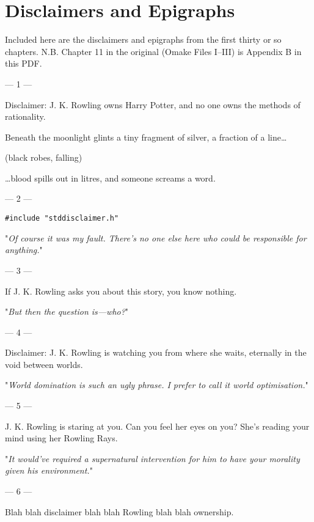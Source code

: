 \chapter{Disclaimers and Epigraphs}

Included here are the disclaimers and epigraphs from the first thirty or so chapters. N.B. Chapter 11 in the original (Omake Files I–III) is Appendix B in this PDF.

{%
\setlength{\parindent}{0pt}
\setlength{\parskip}{1em}

\filbreak
--- 1 ---

Disclaimer: J. K. Rowling owns Harry Potter, and no one owns the methods of rationality.

\begin{em}
Beneath the moonlight glints a tiny fragment of silver, a fraction of a line{\ldots}

(black robes, falling)

{\ldots}blood spills out in litres, and someone screams a word.
\end{em}

\filbreak
--- 2 ---

\texttt{\#include "stddisclaimer.h"}

"\emph{Of course it was my fault. There’s no one else here who could be responsible for anything.}"

\filbreak
--- 3 ---

If J. K. Rowling asks you about this story, you know nothing.

"\emph{But then the question is---who?}"

\filbreak
--- 4 ---

Disclaimer: J. K. Rowling is watching you from where she waits, eternally in the void between worlds.

"\emph{World domination is such an ugly phrase. I prefer to call it world optimisation.}"

\filbreak
--- 5 ---

J. K. Rowling is staring at you. Can you feel her eyes on you? She’s reading your mind using her Rowling Rays.

"\emph{It would’ve required a \emph{supernatural intervention} for him to have \emph{your} morality given \emph{his} environment.}"

\filbreak
--- 6 ---

Blah blah disclaimer blah blah Rowling blah blah ownership.

}

